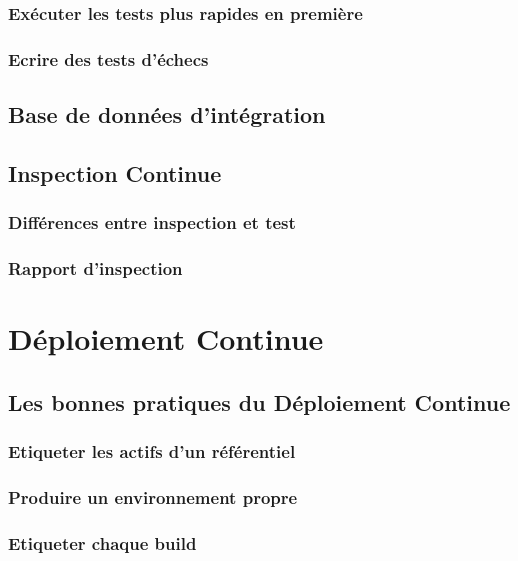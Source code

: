 \documentclass{report}
\begin{document}
        \subsubsection{Exécuter les tests plus rapides en première}

        \subsubsection{Ecrire des tests d’échecs}

      \subsection{Base de données d’intégration}

      \subsection{Inspection Continue}

        \subsubsection{Différences entre inspection et test}

        \subsubsection{Rapport d’inspection}

    \section{Déploiement Continue}

      \subsection{Les bonnes pratiques du Déploiement Continue}

        \subsubsection{Etiqueter les actifs d’un référentiel}

        \subsubsection{Produire un environnement propre}

        \subsubsection{Etiqueter chaque build}
\end{document}

